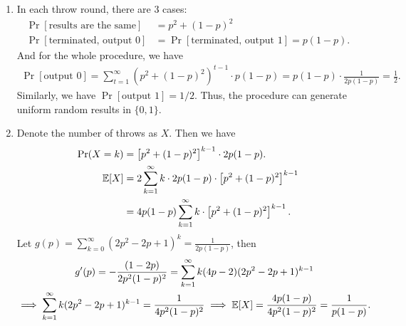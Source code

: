 \begin{answer}
    \begin{enumerate}[label = \alph*).]
        \item In each throw round, there are 3 cases:
        \begin{align*}
            \Pr[\text{results are the same}] &= p^2 + (1-p)^2 \\
            \Pr[\text{terminated, output 0}] &= \Pr[\text{terminated, output 1}] = p(1-p).  
        \end{align*}
        And for the whole procedure, we have 
        \begin{align*}
            \Pr[\text{output 0}] = \sum_{t=1}^{\infty} \left(p^2 + (1-p)^2\right)^{t-1} \cdot p(1-p) = p(1-p) \cdot \frac{1}{2p(1-p)} = \frac{1}{2}.
        \end{align*}
        Similarly, we have $\Pr[\text{output 1}] = 1/2$. Thus, the procedure can generate uniform random results in $\{0,1\}$.
        \item Denote the number of throws as $X$. Then we have 
        \begin{align*}
            \Pr(X = k) &= \left[p^2 + (1-p)^2\right]^{k-1} \cdot 2p(1-p). \\
            \mathbb{E}[X] &= 2\sum_{k=1}^{\infty} k \cdot 2p(1-p) \cdot \left[p^2 + (1-p)^2\right]^{k-1} \\
                &= 4p(1-p) \sum_{k=1}^{\infty} k \cdot \left[p^2 + (1-p)^2\right]^{k-1}.
        \end{align*}
        Let $g(p) = \sum_{k=0}^{\infty} (2p^2 - 2p + 1)^k = \frac{1}{2p(1-p)}$, then 
        \begin{gather*}
                g'(p) = -\frac{(1-2p)}{2p^2(1-p)^2} = \sum_{k=1}^{\infty} k(4p-2)(2p^2-2p+1)^{k-1} \\
                \implies \sum_{k=1}^{\infty} k(2p^2-2p+1)^{k-1} = \frac{1}{4p^2(1-p)^2} \implies \mathbb{E}[X] = \frac{4p(1-p)}{4p^2(1-p)^2} = \frac{1}{p(1-p)}.
        \end{gather*}
    \end{enumerate}
    \ed
\end{answer}